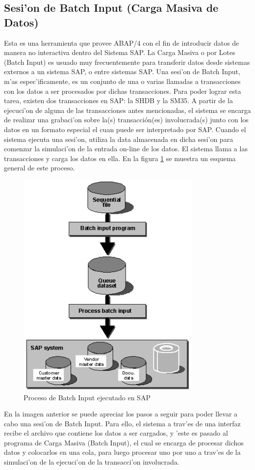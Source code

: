 \subsection{Sesi'on de Batch Input (Carga Masiva de Datos)}
	Esta es una herramienta que provee ABAP/4 con el fin de introducir datos de manera no interactiva dentro del Sistema SAP. La Carga Masiva o por Lotes (Batch Input) es usuado muy frecuentemente para transferir datos desde sistemas externos a un sistema SAP, o entre sistemas SAP. Una sesi'on de Batch Input, m'as espec'ificamente, es un conjunto de una o varias llamadas a transacciones con los datos a ser procesados por dichas transacciones.  
	Para poder lograr esta tarea, existen dos transacciones en SAP: la SHDB y la SM35. A partir de la ejecuci'on de alguna de las transacciones antes mencionadas, el sistema se encarga de realizar una grabaci'on sobre la(s) transacción(es) involucrada(s) junto con los datos en un formato especial el cuan puede ser interpretado por SAP. Cuando el sistema ejecuta una sesi'on, utiliza la data almacenada en dicha sesi'on para comenzar la simulaci'on de la entrada on-line de los datos. El sistema llama a las transacciones y carga los datos en ella. En la figura \ref{fig:process} se muestra un esquema general de este proceso.
 
\begin{figure}[H]
\centering
\includegraphics[scale=1.0,type=jpg,ext=.jpg,read=.jpg]{figures/batch_input_process}
\caption{Proceso de Batch Input ejecutado en SAP}
\label{fig:process}
\end{figure}

	En la imagen anterior se puede apreciar los pasos a seguir para poder llevar a cabo una sesi'on de Batch Input. Para ello, el sistema a trav'es de una interfaz recibe el archivo que contiene los datos a ser cargados, y 'este es pasado al programa de Carga Masiva (Batch Input), el cual se encarga de procesar dichos datos y colocarlos en una cola, para luego procesar uno por uno a trav'es de la simulaci'on de la ejecuci'on de la transacci'on involucrada. 

